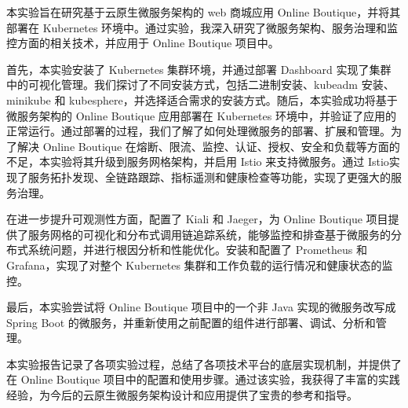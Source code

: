 \begin{cnabstract}
\thispagestyle{empty}
本实验旨在研究基于云原生微服务架构的 web 商城应用 Online Boutique，并将其部署在 Kubernetes 环境中。通过实验，我深入研究了微服务架构、服务治理和监控方面的相关技术，并应用于 Online Boutique 项目中。

首先，本实验安装了 Kubernetes 集群环境，并通过部署 Dashboard 实现了集群中的可视化管理。我们探讨了不同安装方式，包括二进制安装、kubeadm 安装、minikube 和 kubesphere，并选择适合需求的安装方式。随后，本实验成功将基于微服务架构的 Online Boutique 应用部署在 Kubernetes 环境中，并验证了应用的正常运行。通过部署的过程，我们了解了如何处理微服务的部署、扩展和管理。为了解决 Online Boutique 在熔断、限流、监控、认证、授权、安全和负载等方面的不足，本实验将其升级到服务网格架构，并启用 Istio 来支持微服务。通过 Istio实现了服务拓扑发现、全链路跟踪、指标遥测和健康检查等功能，实现了更强大的服务治理。

在进一步提升可观测性方面，配置了 Kiali 和 Jaeger，为 Online Boutique 项目提供了服务网格的可视化和分布式调用链追踪系统，能够监控和排查基于微服务的分布式系统问题，并进行根因分析和性能优化。安装和配置了 Prometheus 和 Grafana，实现了对整个 Kubernetes 集群和工作负载的运行情况和健康状态的监控。

最后，本实验尝试将 Online Boutique 项目中的一个非 Java 实现的微服务改写成 Spring Boot 的微服务，并重新使用之前配置的组件进行部署、调试、分析和管理。

本实验报告记录了各项实验过程，总结了各项技术平台的底层实现机制，并提供了在 Online Boutique 项目中的配置和使用步骤。通过该实验，我获得了丰富的实践经验，为今后的云原生微服务架构设计和应用提供了宝贵的参考和指导。

\end{cnabstract}
\par
\vspace*{2em}





